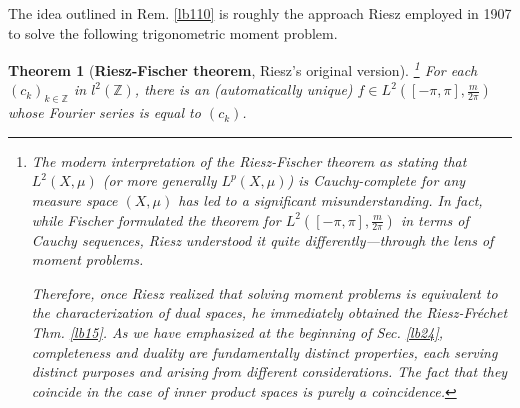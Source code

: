 \documentclass[12pt,b5paper,notitlepage]{article}
\theoremstyle{definition}
\theoremstyle{plain}
\newtheorem{thm}[df]{Theorem}
\newcommand{\Zbb}{\mathbb Z}
\numberwithin{equation}{section}
\begin{document}
The idea outlined in Rem. \ref{lb110} is roughly the approach Riesz employed in 1907 to solve the following trigonometric moment problem.

\begin{thm}[\textbf{Riesz-Fischer theorem}, Riesz's original version]\footnote{The modern interpretation of the Riesz-Fischer theorem as stating that $L^2(X,\mu)$ (or more generally $L^p(X,\mu)$) is Cauchy-complete for any measure space $(X,\mu)$ has led to a significant misunderstanding. In fact, while Fischer formulated the theorem for $L^2([-\pi,\pi],\frac m{2\pi})$ in terms of Cauchy sequences, Riesz understood it quite differently---through the lens of moment problems.

Therefore, once Riesz realized that solving moment problems is equivalent to the characterization of dual spaces, he immediately obtained the Riesz-Fr\'echet Thm. \ref{lb15}. As we have emphasized at the beginning of Sec. \ref{lb24}, completeness and duality are fundamentally distinct properties, each serving distinct purposes and arising from different considerations. The fact that they coincide in the case of inner product spaces is purely a coincidence.}
For each $(c_k)_{k\in\Zbb}$ in $l^2(\Zbb)$, there is an (automatically unique) $f\in L^2([-\pi,\pi],\frac m{2\pi})$ whose Fourier series is equal to $(c_k)$.
\end{thm}
\end{document}
